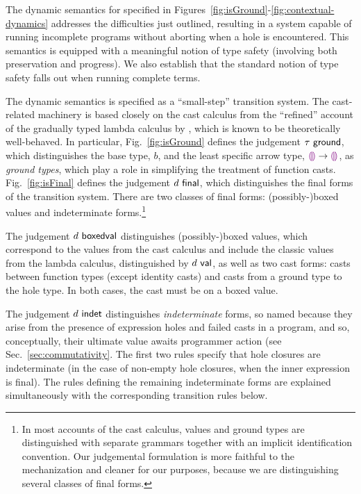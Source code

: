 The dynamic semantics for \HazelnutLive specified in Figures~\ref{fig:isGround}-\ref{fig:contextual-dynamics} addresses the difficulties just outlined, resulting in a system capable of running incomplete programs without aborting when a hole is encountered. This semantics is equipped with a meaningful notion of type safety (involving both preservation and progress). We also establish that the standard notion of type safety falls out when running complete terms. %

The dynamic semantics is specified as a ``small-step'' transition system. The cast-related machinery is based closely on the cast calculus from the ``refined'' account of the gradually typed lambda calculus by \citet{DBLP:conf/snapl/SiekVCB15}, which is known to be theoretically well-behaved. In particular, Fig.~\ref{fig:isGround} defines the judgement $\tau~\mathsf{ground}$, which distinguishes the base type, $b$, and the least specific arrow type, $\textcolor{violet}{\llparenthesis}\textcolor{violet}{\rrparenthesis} \rightarrow \textcolor{violet}{\llparenthesis}\textcolor{violet}{\rrparenthesis}$, as \emph{ground types}, which play a role in simplifying the treatment of function casts. Fig.~\ref{fig:isFinal} defines the judgement $d~\mathsf{final}$, which distinguishes the final forms of the transition system. There are two classes of final forms: (possibly-)boxed values and indeterminate forms.\footnote{In most accounts of the cast calculus, values and ground types are distinguished with separate grammars together with an implicit identification convention. Our judgemental formulation is more faithful to the mechanization and cleaner for our purposes, because we are distinguishing several classes of final forms.}




The judgement $d~\mathsf{boxedval}$ distinguishes (possibly-)boxed values, which correspond to the values from the cast calculus and include the classic values from the lambda calculus, distinguished by $d~\mathsf{val}$, as well as two cast forms: casts between function types (except identity casts) and casts from a ground type to the hole type. In both cases, the cast must be on a boxed value. %

The judgement $d~\mathsf{indet}$ distinguishes \emph{indeterminate} forms, so named because they arise from the presence of expression holes and failed casts in a program, and so, conceptually, their ultimate value awaits programmer action (see Sec.~\ref{sec:commutativity}. The first two rules specify that hole closures are indeterminate (in the case of non-empty hole closures, when the inner expression is final). The rules defining the remaining indeterminate forms are explained simultaneously with the corresponding transition rules below.

